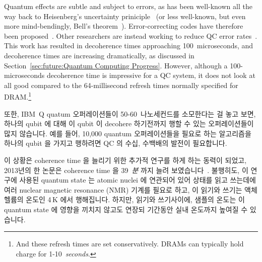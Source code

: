 Quantum effects are subtle and subject to errors, as has been
well-known all the way back to
Heisenberg's uncertainty priniciple~\cite{WeinerHeisenberg1927Uncertain}
(or less well-known, but even more mind-bendingly,
Bell's theorem~\cite{JohnSBell1964EPRparadox}).
Error-correcting codes have therefore been
proposed~\cite{ADCorcoles2015QuantumErrorDetection}.
Other researchers are instead working to reduce QC error
rates~\cite{PhysRevB.77.180502,PhysRevLett.107.240501,PhysRevLett.111.080502,PhysRevB.86.100506,KristanTemme2016QC-error-mitigation}.
This work has resulted in decoherence times approaching 100~microseconds,
and decoherence times are increasing dramatically, as discussed in
Section~\ref{sec:future:Quantum Computing Progress}.
However, although a 100-microseconds decoherence time is impressive for
a QC system, it does not look at all good compared to the 64-millisecond
refresh times normally specified for DRAM.\footnote{
	And these refresh times are set conservatively.
	DRAMs can typically hold charge for 1-10~\emph{seconds}.}
\fi

또한, IBM~Q quatum 오퍼레이션들이 50-60~나노세컨드를 소모한다는 걸 놓고 보면,
하나의 qubit 에 대해 이 qubit 이 decohere 하기전까지 행할 수 있는
오퍼레이션들이 많지 않습니다.
예를 들어, 10,000 quantum 오퍼레이션들을 필요로 하는 알고리즘을 하나의 qubit 을
가지고 행하려면 QC 의 수십, 수백배의 발전이 필요합니다.

이 상황은 coherence time 을 늘리기 위한 추가적 연구를 하게 하는 동력이 되었고,
2013년의 한 논문은 coherence time 을 39~\emph{분} 까지 늘려
보였습니다~\cite{KamyarSaeedi2018QC-39-minutes}.
불행히도, 이 연구에 사용된 quantum state 는 atomic nuclei 에 연관되어 있어
상태를 읽고 쓰는데에 여러 nuclear magnetic resonance (NMR) 기계를 필요로 하고,
이 읽기와 쓰기는 액체 헬륨의 온도인 4\,K 에서 행해집니다.
하지만, 읽기와 쓰기사이에, 샘플의 온도는 이 quantum state 에 영향을 끼치지
않고도 연장되 기간동안 실내 온도까지 높여질 수 있습니다.

